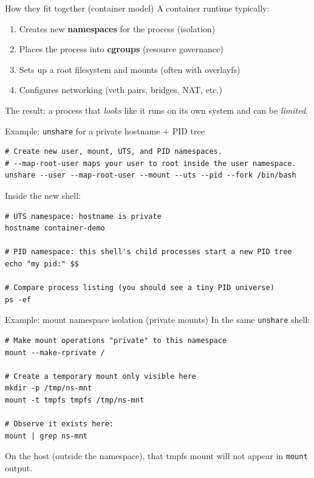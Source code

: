 
\begin{frame}{How they fit together (container model)}
  A container runtime typically:
  \begin{enumerate}
    \item Creates new \textbf{namespaces} for the process (isolation)
    \item Places the process into \textbf{cgroups} (resource governance)
    \item Sets up a root filesystem and mounts (often with overlayfs)
    \item Configures networking (veth pairs, bridges, NAT, etc.)
  \end{enumerate}

  \medskip
  The result: a process that \emph{looks} like it runs on its own system and can be \emph{limited}.
\end{frame}


\begin{frame}[fragile]{Example: \texttt{unshare} for a private hostname + PID tree}
  \begin{lstlisting}[style=sh]
# Create new user, mount, UTS, and PID namespaces.
# --map-root-user maps your user to root inside the user namespace.
unshare --user --map-root-user --mount --uts --pid --fork /bin/bash
\end{lstlisting}

  Inside the new shell:
  \begin{lstlisting}[style=sh]
# UTS namespace: hostname is private
hostname container-demo

# PID namespace: this shell's child processes start a new PID tree
echo "my pid:" $$

# Compare process listing (you should see a tiny PID universe)
ps -ef
\end{lstlisting}
\end{frame}

\begin{frame}[fragile]{Example: mount namespace isolation (private mounts)}
  In the same \texttt{unshare} shell:

  \begin{lstlisting}[style=sh]
# Make mount operations "private" to this namespace
mount --make-rprivate /

# Create a temporary mount only visible here
mkdir -p /tmp/ns-mnt
mount -t tmpfs tmpfs /tmp/ns-mnt

# Observe it exists here:
mount | grep ns-mnt
\end{lstlisting}

  On the host (outside the namespace), that tmpfs mount will not appear in \texttt{mount} output.
\end{frame}

